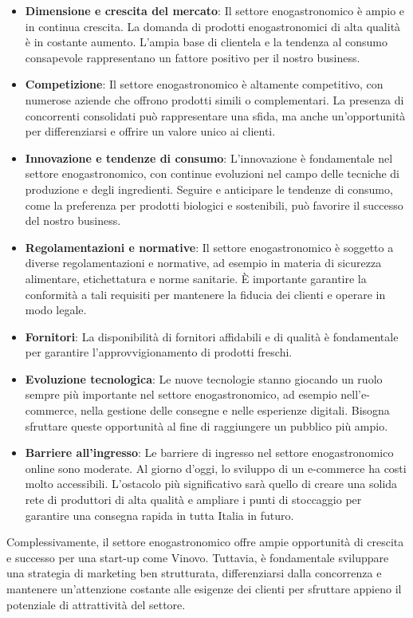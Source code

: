 \documentclass[12pt, a4paper]{article}
\begin{document}
\begin{itemize}
    \item \textbf{Dimensione e crescita del mercato}: Il settore enogastronomico è ampio e in continua crescita. La domanda di prodotti enogastronomici di alta qualità è in costante aumento. L'ampia base di clientela e la tendenza al consumo consapevole rappresentano un fattore positivo per il nostro business.
    \item \textbf{Competizione}: Il settore enogastronomico è altamente competitivo, con numerose aziende che offrono prodotti simili o complementari. La presenza di concorrenti consolidati può rappresentare una sfida, ma anche un'opportunità per differenziarsi e offrire un valore unico ai clienti.
    \item \textbf{Innovazione e tendenze di consumo}: L'innovazione è fondamentale nel settore enogastronomico, con continue evoluzioni nel campo delle tecniche di produzione e degli ingredienti. Seguire e anticipare le tendenze di consumo, come la preferenza per prodotti biologici e sostenibili, può favorire il successo del nostro business.
    \item \textbf{Regolamentazioni e normative}: Il settore enogastronomico è soggetto a diverse regolamentazioni e normative, ad esempio in materia di sicurezza alimentare, etichettatura e norme sanitarie. È importante garantire la conformità a tali requisiti per mantenere la fiducia dei clienti e operare in modo legale.
    \item \textbf{Fornitori}: La disponibilità di fornitori affidabili e di qualità è fondamentale per garantire l'approvvigionamento di prodotti freschi.
    \item \textbf{Evoluzione tecnologica}: Le nuove tecnologie stanno giocando un ruolo sempre più importante nel settore enogastronomico, ad esempio nell'e-commerce, nella gestione delle consegne e nelle esperienze digitali. Bisogna sfruttare queste opportunità al fine di raggiungere un pubblico più ampio.
    \item \textbf{Barriere all'ingresso}: Le barriere di ingresso nel settore enogastronomico online sono moderate. Al giorno d'oggi, lo sviluppo di un e-commerce ha costi molto accessibili. L'ostacolo più significativo sarà quello di creare una solida rete di produttori di alta qualità e ampliare i punti di stoccaggio per garantire una consegna rapida in tutta Italia in futuro.
\end{itemize}
Complessivamente, il settore enogastronomico offre ampie opportunità di crescita e successo per una start-up come Vinovo. Tuttavia, è fondamentale sviluppare una strategia di marketing ben strutturata, differenziarsi dalla concorrenza e mantenere un'attenzione costante alle esigenze dei clienti per sfruttare appieno il potenziale di attrattività del settore.
\end{document}
